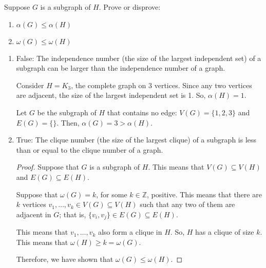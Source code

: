 \documentclass{article}
\newcommand{\Z}{\mathbb{Z}}
\theoremstyle{definition}
\begin{document}
\begin{question}
    Suppose $G$ is a subgraph of $H$.  Prove or disprove:
\begin{enumerate}
	\item $\alpha(G) \leq \alpha(H)$
	\item $\omega(G) \leq \omega(H)$
	\end{enumerate}
\end{question}
\begin{solution}
\begin{enumerate}
	\item False: The independence number (the size of the largest independent set) of a subgraph can be larger than the independence number of a graph.

Consider $H = K_3$, the complete graph on 3 vertices.  Since any two vertices are adjacent, the size of the largest independent set is 1.  So, $\alpha(H)= 1$.

Let $G$ be the subgraph of $H$ that contains no edge: $V(G) = \{1, 2, 3\}$ and $E(G) = \{ \}$.  Then, $\alpha(G) = 3 > \alpha(H)$.

	\item True: The clique number (the size of the largest clique) of a subgraph is less than or equal to the clique number of a graph.

\begin{proof}
Suppose that $G$ is a subgraph of $H$.  This means that $V(G) \subseteq V(H)$ and $E(G) \subseteq E(H)$.

Suppose that $\omega(G) = k$, for some $k \in \Z$, positive.  This means that there are $k$ vertices $v_1, \ldots, v_k \in V(G) \subseteq V(H)$ such that any two of them are adjacent in $G$; that is, $\{v_i, v_j \} \in E(G) \subseteq E(H)$.

This means that $v_1, \ldots, v_k$ also form a clique in $H$.  So, $H$ has a clique of size $k$.  This means that $\omega(H) \geq k = \omega(G)$.

Therefore, we have shown that $\omega(G) \leq \omega(H)$.
\end{proof}
\end{enumerate}
\end{solution}
\end{document}
